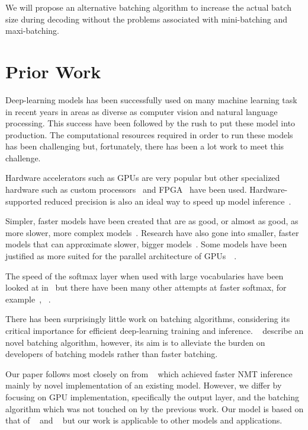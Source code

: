 \documentclass[11pt,a4paper]{article}
\begin{document}
We will propose an alternative batching algorithm to increase the actual batch size during decoding without the problems associated with mini-batching and maxi-batching.

\section{Prior Work}

Deep-learning models has been successfully used on many machine learning task in recent years in areas as diverse as computer vision and natural language processing. This success have been followed by the rush to put these model into production. The computational resources required in order to run these models has been challenging but, fortunately, there has been a lot work to meet this challenge.

Hardware accelerators such as GPUs are very popular but other specialized hardware such as custom processors~\citep{DBLP:journals/corr/JouppiYPPABBBBB17} and FPGA~\citep{DBLP:journals/corr/LaceyTA16} have been used. Hardware-supported reduced precision is also an ideal way to speed up model inference~\citep{DBLP:journals/corr/abs-1710-03740}.

Simpler, faster models have been created that are as good, or almost as good, as more slower, more complex models~\citep{DBLP:journals/corr/BahdanauCB14}. Research have also gone into smaller, faster models that can approximate slower, bigger models~\citep{DBLP:conf/emnlp/KimR16}. Some models have been justified as more suited for the parallel architecture of GPUs~\cite{DBLP:journals/corr/VaswaniSPUJGKP17}~\cite{gehring2017convs2s}.

The speed of the softmax layer when used with large vocabularies have been looked at in~\citet{DBLP:journals/corr/GraveJCGJ16} but there have been many other attempts at faster softmax, for example~\citet{DBLP:journals/corr/abs-1301-3781}, ~\citet{Zoph-2016}.

There has been surprisingly little work on batching algorithms, considering its critical importance for efficient deep-learning training and inference. ~\citet{Neubig-autobatching} describe an novel batching algorithm, however, its aim is to alleviate the burden on developers of batching models rather than faster batching.

Our paper follows most closely on from ~\citet{DBLP:conf/emnlp/Devlin17} which achieved faster NMT inference mainly by novel implementation of an existing model. However, we differ by focusing on GPU implementation, specifically the output layer, and the batching algorithm which was not touched on by the previous work. Our model is based on that of ~\citet{D14-1179} and ~\citet{sennrich-haddow-birch:2016:P16-12} but our work is applicable to other models and applications. %
\end{document}
